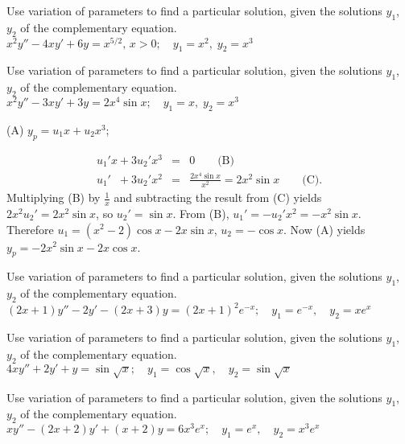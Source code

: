 \documentclass{ximera}
\begin{document}
\begin{problem}\label{exer:5.7.11}
Use variation
of parameters to find a particular solution, given the solutions
$y_1$, $y_2$ of the complementary equation. $x^2y''-4xy'+6y=x^{5/2},\, x > 0;\quad  y_1=x^2,\;  y_2=x^3$
\end{problem}

\begin{problem}\label{exer:5.7.12}
Use variation
of parameters to find a particular solution, given the solutions
$y_1$, $y_2$ of the complementary equation. $x^2y''-3xy'+3y=2x^4\sin x; \quad  y_1=x,\;  y_2=x^3$

\begin{solution}
(A) $y_p=u_1x+u_2x^3$;

\begin{eqnarray*}
u_1'x+3u_2'x^3&=&0\qquad\text{(B)}\\ %
u_1'\phantom{x}+3u_2'x^2&=&\frac{2x^4\sin x}{x^2}=2x^2\sin x \qquad\text{(C)}. %
\end{eqnarray*}
Multiplying (B) by $\frac{1}{x}$ and subtracting
the result from (C) yields $2x^2u_2'=2x^2\sin x$, so
$u_2'=\sin x$. From (B), $u_1'=-u_2'x^2=-x^2\sin x$.
Therefore $u_1=(x^2-2)\cos x-2x\sin x$, $u_2=-\cos x$. Now (A) yields
$y_p=-2x^2\sin x-2x\cos x$.
\end{solution}
\end{problem}

\begin{problem}\label{exer:5.7.13}
Use variation
of parameters to find a particular solution, given the solutions
$y_1$, $y_2$ of the complementary equation. $(2x+1)y''-2y'-(2x+3)y=(2x+1)^2e^{-x}; \quad  y_1=e^{-x},
\quad y_2=xe^x$
\end{problem}

\begin{problem}\label{exer:5.7.14}
Use variation
of parameters to find a particular solution, given the solutions
$y_1$, $y_2$ of the complementary equation. $4xy''+2y'+y=\sin\sqrt x; \quad  y_1=\cos\sqrt x,
\quad y_2=\sin\sqrt x$
\end{problem}

\begin{problem}\label{exer:5.7.15}
Use variation
of parameters to find a particular solution, given the solutions
$y_1$, $y_2$ of the complementary equation. $xy''-(2x+2)y'+(x+2)y=6x^3e^x;\quad  y_1=e^x,\quad  y_2=x^3e^x$
\end{problem}
\end{document}
